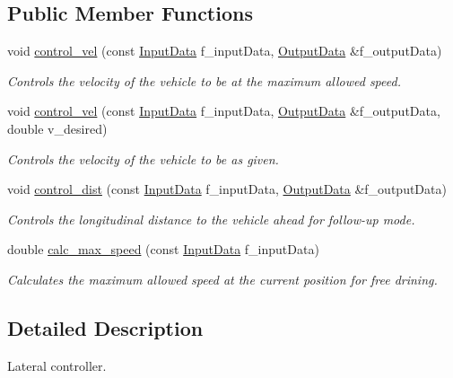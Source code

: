 \subsection*{Public Member Functions}
\begin{DoxyCompactItemize}
\item 
void \mbox{\hyperlink{class_longitudinal_controller_a929cebc70c1503b3d124692aaa46cb2e}{control\+\_\+vel}} (const \mbox{\hyperlink{struct_input_data}{Input\+Data}} f\+\_\+input\+Data, \mbox{\hyperlink{struct_output_data}{Output\+Data}} \&f\+\_\+output\+Data)
\begin{DoxyCompactList}\small\item\em Controls the velocity of the vehicle to be at the maximum allowed speed. \end{DoxyCompactList}\item 
void \mbox{\hyperlink{class_longitudinal_controller_ab397e2217ad705edb2bf4b06d31c8b4e}{control\+\_\+vel}} (const \mbox{\hyperlink{struct_input_data}{Input\+Data}} f\+\_\+input\+Data, \mbox{\hyperlink{struct_output_data}{Output\+Data}} \&f\+\_\+output\+Data, double v\+\_\+desired)
\begin{DoxyCompactList}\small\item\em Controls the velocity of the vehicle to be as given. \end{DoxyCompactList}\item 
void \mbox{\hyperlink{class_longitudinal_controller_a08d81a096be2e181a48ac84df253f065}{control\+\_\+dist}} (const \mbox{\hyperlink{struct_input_data}{Input\+Data}} f\+\_\+input\+Data, \mbox{\hyperlink{struct_output_data}{Output\+Data}} \&f\+\_\+output\+Data)
\begin{DoxyCompactList}\small\item\em Controls the longitudinal distance to the vehicle ahead for follow-\/up mode. \end{DoxyCompactList}\item 
double \mbox{\hyperlink{class_longitudinal_controller_af6e007f4b27571bd8ced67ab357bca4f}{calc\+\_\+max\+\_\+speed}} (const \mbox{\hyperlink{struct_input_data}{Input\+Data}} f\+\_\+input\+Data)
\begin{DoxyCompactList}\small\item\em Calculates the maximum allowed speed at the current position for free drining. \end{DoxyCompactList}\end{DoxyCompactItemize}


\subsection{Detailed Description}
Lateral controller. 


